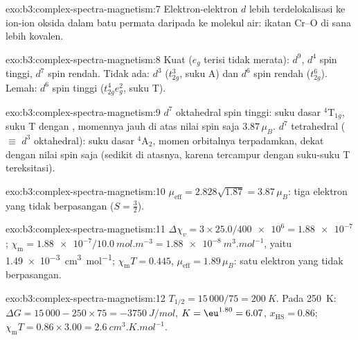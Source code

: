 \begin{solution}{exo:b3:complex-spectra-magnetism:7}
Elektron-elektron $d$ lebih terdelokalisasi ke ion-ion oksida dalam batu permata
daripada ke molekul air: ikatan Cr--O di sana lebih kovalen.
\end{solution}

\begin{solution}{exo:b3:complex-spectra-magnetism:8}
Kuat ($e_g$ terisi tidak merata): $d^9$, $d^4$ spin tinggi, $d^7$ spin rendah. Tidak ada: $d^3$ ($t_{2g}^3$, suku A) dan
$d^6$ spin rendah ($t_{2g}^6$). Lemah: $d^6$ spin tinggi ($t_{2g}^4e_g^2$, suku T).
\end{solution}

\begin{solution}{exo:b3:complex-spectra-magnetism:9}
$d^7$ oktahedral spin tinggi: suku dasar $^4$T$_{1g}$, suku T dengan ,
momennya jauh di atas nilai spin saja $3.87\,\mu_B$. $d^7$ tetrahedral ($\equiv$ $d^3$ oktahedral): suku
dasar $^4$A$_2$, momen orbitalnya terpadamkan, dekat dengan nilai spin saja (sedikit di atasnya,
karena tercampur dengan suku-suku T tereksitasi).
\end{solution}

\begin{solution}{exo:b3:complex-spectra-magnetism:10}
$\mu_{\mathrm{eff}} = 2.828\sqrt{1.87} = 3.87\,\mu_B$: tiga elektron yang tidak berpasangan ($S = \frac32$).
\end{solution}

\begin{solution}{exo:b3:complex-spectra-magnetism:11}
$\Delta\chi_v = 3 \times 25.0/\num{400e6} = \num{1.88e-7}$; $\chi_{\mathrm m} = \num{1.88e-7}/\qty{10.0}{mol.m^{-3}} = \qty{1.88e-8}{m^3.mol^{-1}}$, yaitu
\qty{1.49e-3}{cm^3.mol^{-1}}; $\chi_{\mathrm m}T = 0.445$, $\mu_{\mathrm{eff}} = 1.89\,\mu_B$: satu elektron yang tidak berpasangan.
\end{solution}

\begin{solution}{exo:b3:complex-spectra-magnetism:12}
$T_{1/2} = 15\,000/75 = \qty{200}{K}$. Pada \qty{250}{K}: $\Delta G = 15\,000 - 250 \times 75 = \qty{-3750}{J/mol}$, $K = \eu^{1.80} = 6.07$,
$x_{\mathrm{HS}} = 0.86$; $\chi_{\mathrm m}T = 0.86 \times 3.00 = \qty{2.6}{cm^3.K.mol^{-1}}$.
\end{solution}

